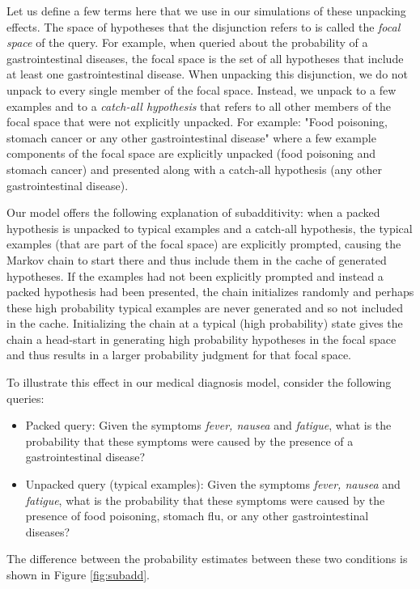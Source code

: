 Let us define a few terms here that we use in our simulations of these unpacking effects. The space of hypotheses that the disjunction refers to is called the \textit{focal space} of the query. For example, when queried about the probability of a gastrointestinal diseases, the focal space is the set of all hypotheses that include at least one gastrointestinal disease. When unpacking this disjunction, we do not unpack to every single member of the focal space. Instead, we unpack to a few examples and to a \textit{catch-all hypothesis} that refers to all other members of the focal space that were not explicitly unpacked. For example: "Food poisoning, stomach cancer or any other gastrointestinal disease" where a few example components of the focal space are explicitly unpacked (food poisoning and stomach cancer) and presented along with a catch-all hypothesis (any other gastrointestinal disease).

Our model offers the following explanation of subadditivity: when a packed hypothesis is unpacked to typical examples and a catch-all hypothesis, the typical examples (that are part of the focal space) are explicitly prompted, causing the Markov chain to start there and thus include them in the cache of generated hypotheses. If the examples had not been explicitly prompted and instead a packed hypothesis had been presented, the chain initializes randomly and perhaps these high probability typical examples are never generated and so not included in the cache. Initializing the chain at a typical (high probability) state gives the chain a head-start in generating high probability hypotheses in the focal space and thus results in a larger probability judgment for that focal space.

To illustrate this effect in our medical diagnosis model, consider the following queries: 
\begin{itemize}
\item Packed query: Given the symptoms \emph{fever, nausea} and \emph{fatigue}, what is the probability that these symptoms were caused by the presence of a gastrointestinal disease? 
\item Unpacked query (typical examples): Given the symptoms \emph{fever, nausea} and \emph{fatigue}, what is the probability that these symptoms were caused by the presence of food poisoning, stomach flu, or any other gastrointestinal diseases?
\end{itemize}
The difference between the probability estimates between these two conditions is shown in Figure \ref{fig:subadd}.

